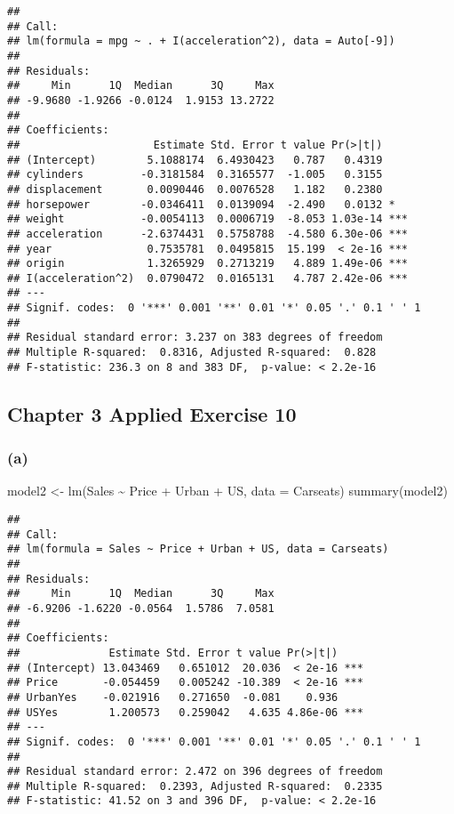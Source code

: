 \documentclass[
]{article}
\newenvironment{Shaded}{\begin{snugshade}}{\end{snugshade}}
\newcommand{\AttributeTok}[1]{\textcolor[rgb]{0.77,0.63,0.00}{#1}}
\newcommand{\FunctionTok}[1]{\textcolor[rgb]{0.00,0.00,0.00}{#1}}
\newcommand{\NormalTok}[1]{#1}
\newcommand{\OtherTok}[1]{\textcolor[rgb]{0.56,0.35,0.01}{#1}}
\newcommand{\SpecialCharTok}[1]{\textcolor[rgb]{0.00,0.00,0.00}{#1}}
\begin{document}
\begin{verbatim}
## 
## Call:
## lm(formula = mpg ~ . + I(acceleration^2), data = Auto[-9])
## 
## Residuals:
##     Min      1Q  Median      3Q     Max 
## -9.9680 -1.9266 -0.0124  1.9153 13.2722 
## 
## Coefficients:
##                     Estimate Std. Error t value Pr(>|t|)    
## (Intercept)        5.1088174  6.4930423   0.787   0.4319    
## cylinders         -0.3181584  0.3165577  -1.005   0.3155    
## displacement       0.0090446  0.0076528   1.182   0.2380    
## horsepower        -0.0346411  0.0139094  -2.490   0.0132 *  
## weight            -0.0054113  0.0006719  -8.053 1.03e-14 ***
## acceleration      -2.6374431  0.5758788  -4.580 6.30e-06 ***
## year               0.7535781  0.0495815  15.199  < 2e-16 ***
## origin             1.3265929  0.2713219   4.889 1.49e-06 ***
## I(acceleration^2)  0.0790472  0.0165131   4.787 2.42e-06 ***
## ---
## Signif. codes:  0 '***' 0.001 '**' 0.01 '*' 0.05 '.' 0.1 ' ' 1
## 
## Residual standard error: 3.237 on 383 degrees of freedom
## Multiple R-squared:  0.8316, Adjusted R-squared:  0.828 
## F-statistic: 236.3 on 8 and 383 DF,  p-value: < 2.2e-16
\end{verbatim}

\hypertarget{chapter-3-applied-exercise-10}{%
\subsection{Chapter 3 Applied Exercise
10}\label{chapter-3-applied-exercise-10}}

\hypertarget{a-3}{%
\subsubsection{(a)}\label{a-3}}

\begin{Shaded}
\begin{Highlighting}[]
\NormalTok{model2 }\OtherTok{\textless{}{-}} \FunctionTok{lm}\NormalTok{(Sales }\SpecialCharTok{\textasciitilde{}}\NormalTok{ Price }\SpecialCharTok{+}\NormalTok{ Urban }\SpecialCharTok{+}\NormalTok{ US, }\AttributeTok{data =}\NormalTok{ Carseats)}
\FunctionTok{summary}\NormalTok{(model2)}
\end{Highlighting}
\end{Shaded}

\begin{verbatim}
## 
## Call:
## lm(formula = Sales ~ Price + Urban + US, data = Carseats)
## 
## Residuals:
##     Min      1Q  Median      3Q     Max 
## -6.9206 -1.6220 -0.0564  1.5786  7.0581 
## 
## Coefficients:
##              Estimate Std. Error t value Pr(>|t|)    
## (Intercept) 13.043469   0.651012  20.036  < 2e-16 ***
## Price       -0.054459   0.005242 -10.389  < 2e-16 ***
## UrbanYes    -0.021916   0.271650  -0.081    0.936    
## USYes        1.200573   0.259042   4.635 4.86e-06 ***
## ---
## Signif. codes:  0 '***' 0.001 '**' 0.01 '*' 0.05 '.' 0.1 ' ' 1
## 
## Residual standard error: 2.472 on 396 degrees of freedom
## Multiple R-squared:  0.2393, Adjusted R-squared:  0.2335 
## F-statistic: 41.52 on 3 and 396 DF,  p-value: < 2.2e-16
\end{verbatim}
\end{document}
